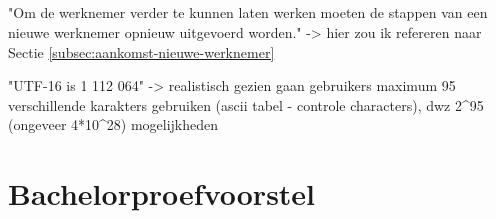 \subsection{}
"Om de werknemer verder te kunnen laten werken moeten de stappen van een
nieuwe werknemer opnieuw uitgevoerd worden." -> hier zou ik refereren naar
Sectie \ref{subsec:aankomst-nieuwe-werknemer}

"UTF-16 is 1 112 064" -> realistisch gezien gaan gebruikers maximum 95
verschillende karakters gebruiken (ascii tabel - controle characters), dwz
2\textasciicircum95 (ongeveer 4*10\textasciicircum28) mogelijkheden

\section{Bachelorproefvoorstel}

